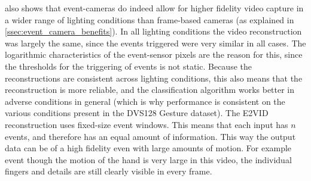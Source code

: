  also shows that event-cameras do indeed allow for higher fidelity video capture in a wider range of lighting conditions than frame-based cameras (as explained in \cref{ssec:event_camera_benefits}). In all lighting conditions the video reconstruction was largely the same, since the events triggered were very similar in all cases. The logarithmic characteristics of the event-sensor pixels are the reason for this, since the thresholds for the triggering of events is not static. Because the reconstructions are consistent across lighting conditions, this also means that the reconstruction is more reliable, and the classification algorithm works better in adverse conditions in general (which is why performance is consistent on the various conditions present in the DVS128 Gesture dataset). The E2VID reconstruction uses fixed-size event windows. This means that each input has $ n $ events, and therefore has an equal amount of information. This way the output data can be of a high fidelity even with large amounts of motion. For example event though the motion of the hand is very large in this video, the individual fingers and details are still clearly visible in every frame.


